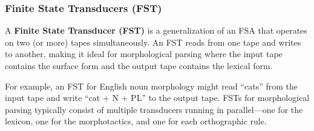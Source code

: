 \documentclass[11pt,a4paper]{article}
\begin{document}
\subsubsection{Finite State Transducers (FST)}

A \textbf{Finite State Transducer (FST)} is a generalization of an FSA that operates on two (or more) tapes simultaneously. An FST reads from one tape and writes to another, making it ideal for morphological parsing where the input tape contains the surface form and the output tape contains the lexical form.

For example, an FST for English noun morphology might read ``cats'' from the input tape and write ``cat + N + PL'' to the output tape. FSTs for morphological parsing typically consist of multiple transducers running in parallel---one for the lexicon, one for the morphotactics, and one for each orthographic rule.
\end{document}
